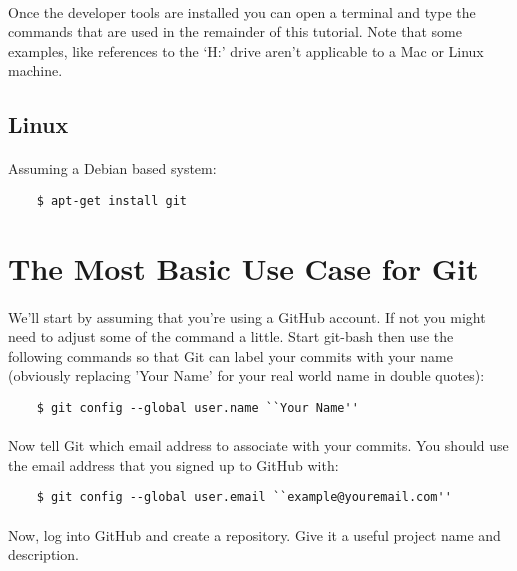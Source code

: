 \documentclass[10pt, a4paper]{article}
\begin{document}
\paragraph{} Once the developer tools are installed you can open a terminal and type the commands that are used in the remainder of this tutorial. Note that some examples, like references to the `H:' drive aren't applicable to a Mac or Linux machine.

\subsection{Linux}
\paragraph{} Assuming a Debian based system:

\begin{lstlisting}
    $ apt-get install git
\end{lstlisting}


\section{The Most Basic Use Case for Git}

\paragraph{} We'll start by assuming that you're using a GitHub account. If not you might need to adjust some of the command a little. Start git-bash then use the following commands so that Git can label your commits with your name (obviously replacing 'Your Name' for your real world name in double quotes):

\begin{lstlisting}
    $ git config --global user.name ``Your Name''
\end{lstlisting}

\paragraph{} Now tell Git which email address to associate with your commits. You should use the email address that you signed up to GitHub with:

\begin{lstlisting}
    $ git config --global user.email ``example@youremail.com''
\end{lstlisting}

\paragraph{} Now, log into GitHub and create a repository. Give it a useful project name and description. 
\end{document}
